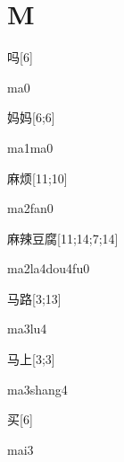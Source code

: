 ﻿%
\section*{M}

\begin{verbete}[ma0]{吗}[6]
\begin{pronuncia}{ma0}
\end{pronuncia}
\end{verbete}

\begin{verbete}[ma1ma0]{妈妈}[6;6]
\begin{pronuncia}{ma1ma0}
\end{pronuncia}
\end{verbete}

\begin{verbete}[ma2fan0]{麻烦}[11;10]
\begin{pronuncia}{ma2fan0}
\end{pronuncia}
\end{verbete}

\begin{verbete}[ma2la4dou4fu0]{麻辣豆腐}[11;14;7;14]
\begin{pronuncia}[\\]{ma2la4dou4fu0}
\end{pronuncia}
\end{verbete}

\begin{verbete}[ma3lu4]{马路}[3;13]
\begin{pronuncia}{ma3lu4}
\end{pronuncia}
\end{verbete}

\begin{verbete}[ma3shang4]{马上}[3;3]
\begin{pronuncia}{ma3shang4}
\end{pronuncia}
\end{verbete}

\begin{verbete}[mai3]{买}[6]
\begin{pronuncia}{mai3}
\end{pronuncia}
\end{verbete}

